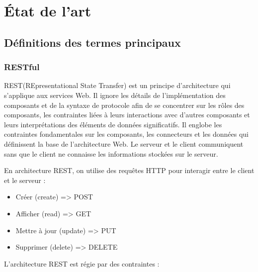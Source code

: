 \chapter{État de l'art}

\section{Définitions des termes principaux}

\subsection{RESTful}
REST(REpresentational State Transfer) \cite{Fie00} est un principe d'architecture qui s'applique aux services Web. Il ignore les détails de l'implémentation des composants et de la syntaxe de protocole afin de se concentrer sur les rôles des composants, les contraintes liées à leurs interactions avec d'autres composants et leurs interprétations des éléments de données significatifs. Il englobe les contraintes fondamentales sur les composants, les connecteurs et les données qui définissent la base de l'architecture Web. Le serveur et le client communiquent sans que le client ne connaisse les informations stockées sur le serveur. 
\newline

\noindent
En architecture REST, on utilise des requêtes HTTP pour interagir entre le client et le serveur : 
\begin{itemize}
    \item Créer (create) => POST
    \item Afficher (read) => GET
    \item Mettre à jour (update) => PUT
    \item Supprimer (delete) => DELETE
    \newline
\end{itemize}

\noindent
L'architecture REST est régie par des contraintes :

